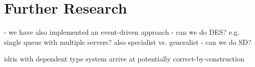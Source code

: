 \section{Further Research}
- we have also implemented an event-driven approach
- can we do DES? e.g. single queue with multiple servers? also specialist vs. generalist
- can we do SD?

idris with dependent type system arrive at potentially correct-by-construction